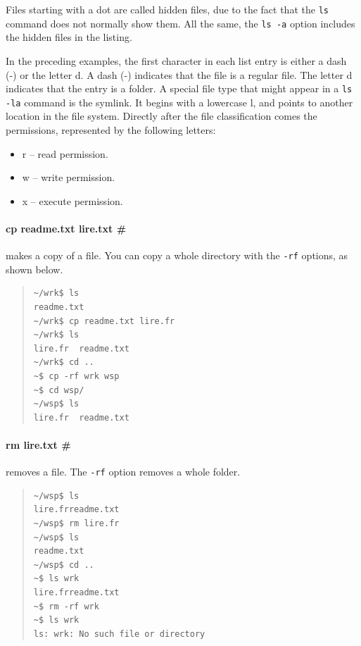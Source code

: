 \documentclass[a4paper,12pt]{book}
\begin{document}
Files starting with a dot are called hidden files,
due to the fact that the \verb|ls| command does not
normally show them. All the same,
the \verb|ls -a| option includes the
hidden files in the listing.

In the preceding examples, the first character
in each list entry is either a dash (-) or the letter d.
A dash (-) indicates that the file is a regular file.
The letter d indicates that the entry is a folder.
A special file type that might appear in a
\verb|ls -la| command is the symlink. It begins
with a lowercase l, and points to another location
in the file system.
Directly after the file classification comes the permissions,
represented by the following letters:
\begin{itemize}
\item r -- read permission.
\item w -- write permission.
\item x -- execute permission.
\end{itemize}

\paragraph{cp readme.txt lire.txt \#} 
makes a copy
of a file. You can copy a whole directory
with the \verb|-rf| options, as shown below.
\begin{quote}
\begin{verbatim}
~/wrk$ ls
readme.txt
~/wrk$ cp readme.txt lire.fr
~/wrk$ ls
lire.fr  readme.txt
~/wrk$ cd ..
~$ cp -rf wrk wsp
~$ cd wsp/
~/wsp$ ls
lire.fr  readme.txt
\end{verbatim}
\end{quote}

\paragraph{rm lire.txt \#} 
removes a file.
The \verb|-rf| option 
removes a whole folder.
\begin{quote}
\begin{verbatim}
~/wsp$ ls
lire.frreadme.txt
~/wsp$ rm lire.fr
~/wsp$ ls
readme.txt
~/wsp$ cd ..
~$ ls wrk
lire.frreadme.txt
~$ rm -rf wrk
~$ ls wrk
ls: wrk: No such file or directory
\end{verbatim}
\end{quote}
\end{document}
